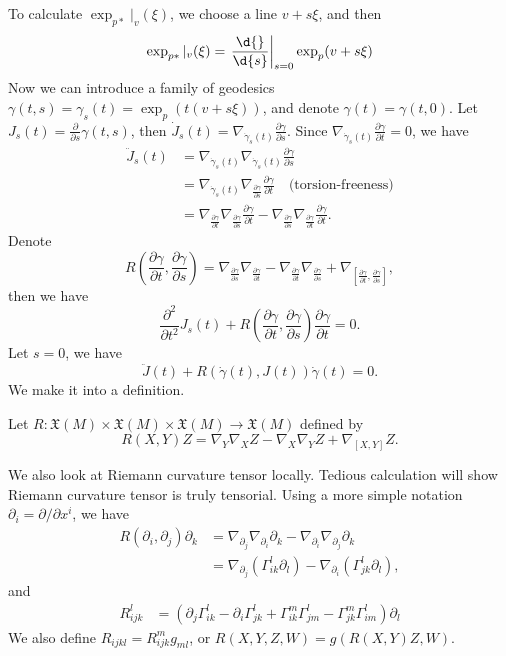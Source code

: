 To calculate $\exp_{p*}|_v(\xi)$, we choose a line $v+s\xi$, and then
\[\exp_{p*}|_v(\xi)=\left.\frac{\d{}}{\d{s}}\right|_{s=0}\exp_p(v+s\xi)\]
Now we can introduce a family of geodesics $\gamma(t,s)=\gamma_s(t)=\exp_p(t(v+s\xi))$, and denote $\gamma(t)=\gamma(t,0)$.
Let $J_s(t)=\frac{\partial{}}{\partial{s}}\gamma(t,s)$, then $\dot{J}_s(t)=\nabla_{\dot{\gamma}_s(t)}\frac{\partial{\gamma}}{\partial{s}}$.
Since $\nabla_{\dot{\gamma}_s(t)}\frac{\partial{\gamma}}{\partial{t}}=0$, we have
\begin{align*}
    \ddot{J}_s(t)&=\nabla_{\dot{\gamma}_s(t)}\nabla_{\dot{\gamma}_s(t)}\frac{\partial{\gamma}}{\partial{s}}\\
    &=\nabla_{\dot{\gamma}_s(t)}\nabla_{\frac{\partial{\gamma}}{\partial{s}}}\frac{\partial{\gamma}}{\partial{t}}\quad\text{(torsion-freeness)}\\
    &=\nabla_{\frac{\partial{\gamma}}{\partial{t}}}\nabla_{\frac{\partial{\gamma}}{\partial{s}}}\frac{\partial{\gamma}}{\partial{t}}-\nabla_{\frac{\partial{\gamma}}{\partial{s}}}\nabla_{\frac{\partial{\gamma}}{\partial{t}}}\frac{\partial{\gamma}}{\partial{t}}.
\end{align*}
Denote
\[R\left(\frac{\partial{\gamma}}{\partial{t}},\frac{\partial{\gamma}}{\partial{s}}\right)=\nabla_{\frac{\partial{\gamma}}{\partial{s}}}\nabla_{\frac{\partial{\gamma}}{\partial{t}}}-\nabla_{\frac{\partial{\gamma}}{\partial{t}}}\nabla_{\frac{\partial{\gamma}}{\partial{s}}}+\nabla_{\left[\frac{\partial{\gamma}}{\partial t},\frac{\partial{\gamma}}{\partial{s}}\right]},\]
then we have
\[\frac{\partial^2{}}{\partial{t^2}}J_s(t)+R\left(\frac{\partial{\gamma}}{\partial{t}},\frac{\partial{\gamma}}{\partial{s}}\right)\frac{\partial{\gamma}}{\partial{t}}=0.\]
Let $s=0$, we have
\[\ddot{J}(t)+R(\dot{\gamma}(t),J(t))\dot{\gamma}(t)=0.\]
We make it into a definition.

\begin{defn}
    Let $R:\mathfrak{X}(M)\times\mathfrak{X}(M)\times\mathfrak{X}(M)\to\mathfrak{X}(M)$ defined by
    \[R(X,Y)Z=\nabla_Y\nabla_XZ-\nabla_X\nabla_YZ+\nabla_{[X,Y]}Z.\]
\end{defn}

We also look at Riemann curvature tensor locally.
Tedious calculation will show Riemann curvature tensor is truly tensorial.
Using a more simple notation $\partial_i=\partial{}/\partial{x^i}$, we have
\begin{align*}
    R(\partial_i,\partial_j)\partial_k&=\nabla_{\partial_j}\nabla_{\partial_i}\partial_k-\nabla_{\partial_i}\nabla_{\partial_j}\partial_k\\
    &=\nabla_{\partial_j}(\Gamma^l_{ik}\partial_l)-\nabla_{\partial_i}(\Gamma^l_{jk}\partial_l),
\end{align*}
and
\begin{align*}
    R_{ijk}^l&=(\partial_j\Gamma^l_{ik}-\partial_i\Gamma^l_{jk}+\Gamma^m_{ik}\Gamma^l_{jm}-\Gamma^m_{jk}\Gamma^l_{im})\partial_l%
\end{align*}
We also define $R_{ijkl}=R_{ijk}^mg_{ml}$, or $R(X,Y,Z,W)=g(R(X,Y)Z,W)$.

